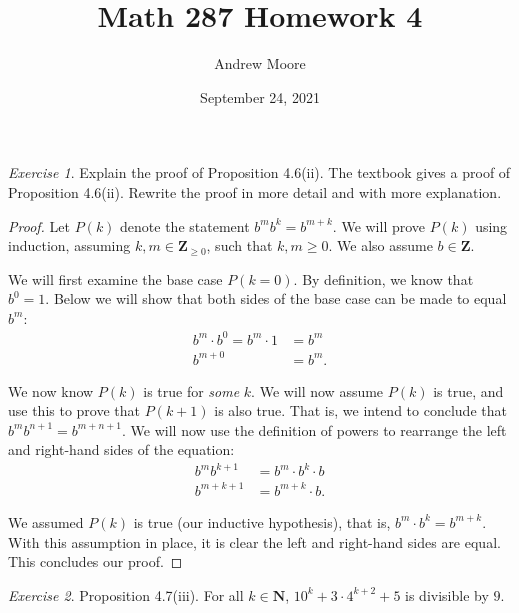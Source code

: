 \documentclass[12pt,oneside]{amsart}
\title{Math 287 Homework 4}
\author{Andrew Moore}
\date{September 24, 2021} %
\theoremstyle{remark}
\newtheorem{exer}{Exercise}
\newcommand{\bfN}{\mathbf{N}}
\newcommand{\bfZ}{\mathbf{Z}}
\begin{document}
\maketitle

%
%
%
%

\newpage
\begin{exer}
Explain the proof of Proposition 4.6(ii). The textbook gives a proof of Proposition 4.6(ii). Rewrite the proof in more detail and with more explanation.
\end{exer}

\begin{proof}
Let $P(k)$ denote the statement $b^mb^k = b^{m + k}$. We will prove $P(k)$ using induction, assuming $k, m \in \bfZ_{\geq 0}$, such that $k,m \geq 0$. We also assume $b \in \bfZ$.

We will first examine the base case $P(k = 0)$. By definition, we know that $b^0 = 1$. Below we will show that both sides of the base case can be made to equal $b^m$:
\begin{align*}
b^m \cdot b^0 = b^m \cdot 1 &= b^m \tag{by Axiom 1.3} \\
                  b^{m + 0} &= b^m. \tag{combining the exponents, m + 0 = m}
\end{align*}

We now know $P(k)$ is true for \emph{some} $k$. We will now assume $P(k)$ is true, and use this to prove that $P(k + 1)$ is also true. That is, we intend to conclude that $b^mb^{n + 1} = b^{m + n + 1}$. We will now use the definition of powers to rearrange the left and right-hand sides of the equation:
\begin{align*}
 b^mb^{k + 1} &= b^m \cdot b^k \cdot b \\
b^{m + k + 1} &= b^{m + k} \cdot b.
\end{align*}

We assumed $P(k)$ is true (our inductive hypothesis), that is, $b^m \cdot b^k = b^{m + k}$. With this assumption in place, it is clear the left and right-hand sides are equal. This concludes our proof.
\end{proof}

%
%
%
%

\newpage
\begin{exer}
Proposition 4.7(iii). For all $k \in \bfN$, $10^k + 3 \cdot 4^{k+2} + 5$ is divisible by $9$.
\end{exer}
\end{document}
